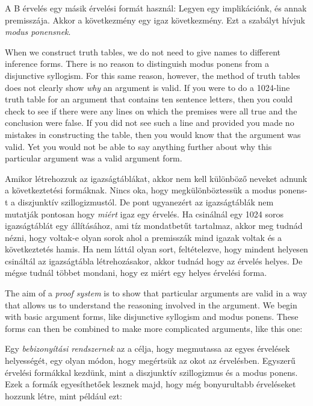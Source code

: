 A B érvelés egy másik érvelési formát használ: Legyen egy implikációnk, és annak premisszája. Akkor a következmény egy igaz következmény. Ezt a szabályt hívjuk \emph{modus ponensnek}.

 When we construct truth tables, we do not need to give names to different inference forms. There is no reason to distinguish modus ponens from a disjunctive syllogism. For this same reason, however, the method of truth tables does not clearly show \emph{why} an argument is valid. If you were to do a 1024-line truth table for an argument that contains ten sentence letters, then you could check to see if there were any lines on which the premises were all true and the conclusion were false. If you did not see such a line and provided you made no mistakes in constructing the table, then you would know that the argument was valid. Yet you would not be able to say anything further about why this particular argument was a valid argument form.
 
Amikor létrehozzuk az igazságtáblákat, akkor nem kell különböző neveket adnunk a következtetési formáknak. Nincs oka, hogy megkülönböztessük a modus ponens-t a diszjunktív szillogizmustól. De pont ugyanezért az igazságtáblák nem mutatják pontosan hogy  \emph{miért} igaz egy érvelés. Ha csinálnál egy 1024 soros igazságtáblát egy állításához, ami tíz mondatbetűt tartalmaz, akkor meg tudnád nézni, hogy voltak-e olyan sorok ahol a premisszák mind igazak voltak és a következtetés hamis. Ha nem láttál olyan sort, feltételezve, hogy mindent helyesen csináltál az igazságtábla létrehozásakor, akkor tudnád hogy az érvelés helyes. De mégse tudnál többet mondani, hogy ez miért egy helyes érvelési forma. 

The aim of a \emph{proof system} is to show that particular arguments are valid in a way that allows us to understand the reasoning involved in the argument. We begin with basic argument forms, like disjunctive syllogism and modus ponens. These forms can then be combined to make more complicated arguments, like this one:

Egy \emph{bebizonyítási rendszernek} az a célja, hogy megmutassa az egyes érvelések helyességét, egy olyan módon, hogy megértsük az okot az érvelésben. Egyszerű érvelési formákkal kezdünk, mint a diszjunktív szillogizmus és a modus ponens. Ezek a formák egyesíthetőek lesznek majd, hogy még bonyurultabb érveléseket hozzunk létre, mint például ezt:



